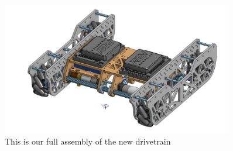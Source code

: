 \begin{figure}[htp]
\centering
\includegraphics[width=0.9\textwidth, angle=0]{Meetings/August/08-08-21/8-8-21_Image6-FullAsm - Nathan Forrer.PNG}
\caption{This is our full assembly of the new drivetrain}
\label{fig:080821_6}
\end{figure}


